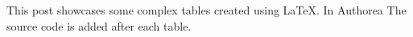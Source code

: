 This post showcases some complex tables created using LaTeX. In Authorea The source code is added after each table.

\newline